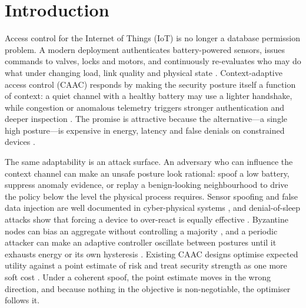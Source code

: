 \section{Introduction}
\label{sec:intro}

Access control for the Internet of Things (IoT) is no longer a database
permission problem. A modern deployment authenticates battery-powered sensors,
issues commands to valves, locks and motors, and continuously re-evaluates who
may do what under changing load, link quality and physical state
\cite{ravidas2019access,qiu2020survey}. Context-adaptive access control (CAAC)
responds by making the security posture itself a function of context: a quiet
channel with a healthy battery may use a lighter handshake, while congestion or
anomalous telemetry triggers stronger authentication and deeper inspection
\cite{atlam2017overview,rath2017adaptive,genc2019context,arfaoui2019context}.
The promise is attractive because the alternative---a single high posture---is
expensive in energy, latency and false denials on constrained devices
\cite{elgendi2019protecting,elhajj2019survey}.

The same adaptability is an attack surface. An adversary who can influence the
context channel can make an unsafe posture look rational: spoof a low battery,
suppress anomaly evidence, or replay a benign-looking neighbourhood to drive the
policy below the level the physical process requires. Sensor spoofing and false
data injection are well documented in cyber-physical systems
\cite{barua2020special,li2019optimal,ye2020summation}, and denial-of-sleep
attacks show that forcing a device to over-react is equally effective
\cite{brownfield2005wireless,raymond2009effects}. Byzantine nodes can bias an
aggregate without controlling a majority \cite{lamport1982byzantine}, and a
periodic attacker can make an adaptive controller oscillate between postures
until it exhausts energy or its own hysteresis \cite{kephart2003vision,cheng2009software}.
Existing CAAC designs optimise expected utility against a point estimate of
risk and treat security strength as one more soft cost
\cite{lee2017situational,moura2017sotraace,hussainalnaji2022cab}. Under a
coherent spoof, the point estimate moves in the wrong direction, and because
nothing in the objective is non-negotiable, the optimiser follows it.

